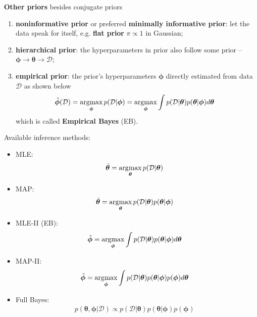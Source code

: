 \textbf{Other priors} besides conjugate priors
\begin{enumerate}[(1)]\label{kspt:noninfo}
    \item \textbf{noninformative prior} or preferred \textbf{minimally informative prior}: 
    let the data speak for itself, 
    e.g. \textbf{flat prior} $\pi\propto 1$ in Gaussian;
    \item \textbf{hierarchical prior}: the hyperparameters in prior also follow some prior --
    $\bm{\phi}\to\bm{\theta}\to\mathcal{D}$;
    \item \textbf{empirical prior}: the prior's hyperparameters $\bm{\phi}$ directly estimated from data $\mathcal{D}$ as shown below
    \begin{gather}
        \hat{\bm{\phi}}(\mathcal{D})
        = \operatorname*{\arg\!max}_{\bm{\phi}}p(\mathcal{D}|\bm{\phi})
        = \operatorname*{\arg\!max}_{\bm{\phi}}\int{p(\mathcal{D}|\bm{\theta})p(\bm{\theta}|\bm{\phi})}d\bm{\theta}
    \end{gather}
    which is called \textbf{Empirical Bayes} (EB).
\end{enumerate}

Available inference methods:
\begin{itemize}
    \item MLE:
    \begin{gather}
        \hat{\bm{\theta}}
    =\operatorname*{\arg\!max}_{\bm{\theta}}
    p(\mathcal{D}|\bm{\theta})
    \end{gather}
    \item MAP: 
    \begin{gather}
        \hat{\bm{\theta}}
    =\operatorname*{\arg\!max}_{\bm{\theta}}
    p(\mathcal{D}|\bm{\theta})p(\bm{\theta}|\bm{\phi})
    \end{gather}
    \item MLE-II (EB):
    \begin{gather}
        \hat{\bm{\phi}}
    =\operatorname*{\arg\!max}_{\bm{\phi}}
    \int{p(\mathcal{D}|\bm{\theta})p(\bm{\theta}|\bm{\phi})}d\bm{\theta}
    \end{gather}
    \item MAP-II:
    \begin{gather}
        \hat{\bm{\phi}}
    =\operatorname*{\arg\!max}_{\bm{\phi}}
    \int{p(\mathcal{D}|\bm{\theta})p(\bm{\theta}|\bm{\phi})p(\bm{\phi})}d\bm{\theta}
    \end{gather}
    \item Full Bayes:
    \begin{gather}
        p(\bm{\theta},\bm{\phi}|\mathcal{D})
    \propto p(\mathcal{D}|\bm{\theta})p(\bm{\theta}|\bm{\phi})p(\bm{\phi})
    \end{gather}
\end{itemize}

